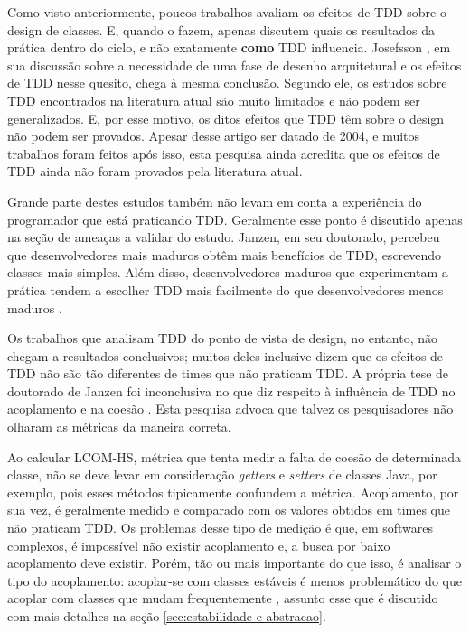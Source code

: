 Como visto anteriormente, poucos trabalhos avaliam os efeitos de TDD sobre o
design de classes. E, quando o fazem, apenas discutem quais os resultados da prática
dentro do ciclo, e não exatamente \textbf{como} TDD influencia. Josefsson
\cite{josefsson}, em sua discussão sobre a necessidade de uma fase de desenho
arquitetural e os efeitos de TDD nesse quesito, chega à mesma conclusão. Segundo
ele, os estudos sobre TDD encontrados na literatura atual são muito limitados e
não podem ser generalizados. E, por esse motivo, os ditos efeitos que TDD têm 
sobre o design não podem ser provados. Apesar desse artigo ser datado de 2004, e
muitos trabalhos foram feitos após isso, esta pesquisa ainda acredita que os
efeitos de TDD ainda não foram provados pela literatura atual.

Grande parte destes estudos também não levam em conta a experiência do
programador que está praticando TDD. Geralmente esse ponto é discutido apenas 
na seção de ameaças a validar do estudo. Janzen, em seu doutorado, percebeu que
desenvolvedores mais maduros obtêm mais benefícios de TDD, escrevendo classes
mais simples. Além disso, desenvolvedores maduros que experimentam a prática
tendem a escolher TDD mais facilmente do que desenvolvedores menos maduros
\cite{janzen-phd}.

Os trabalhos que analisam TDD do ponto de vista de design, no entanto, não
chegam a resultados conclusivos; muitos deles inclusive dizem que os efeitos
de TDD não são tão diferentes de times que não praticam TDD.  A própria tese de
doutorado de Janzen foi inconclusiva no que diz respeito à influência de TDD no 
acoplamento e na coesão \cite{janzen-phd}. Esta pesquisa advoca que talvez os 
pesquisadores não olharam as métricas da maneira correta.

Ao calcular LCOM-HS, métrica que tenta medir a falta de coesão de determinada
classe, não se deve levar em consideração \textit{getters} e \textit{setters} de
classes Java, por exemplo, pois esses métodos tipicamente confundem a métrica.
Acoplamento, por sua vez, é geralmente medido e comparado com os valores
obtidos em times que não praticam TDD. Os problemas desse tipo de medição é que,
em softwares complexos, é impossível não existir acoplamento e, a busca por
baixo acoplamento deve existir. Porém, tão ou mais importante do que isso, é
analisar o tipo do acoplamento: acoplar-se com classes estáveis é menos
problemático do que acoplar com classes que mudam frequentemente
\cite{bob-martin}, assunto esse que é discutido com mais detalhes na seção
\ref{sec:estabilidade-e-abstracao}. 

